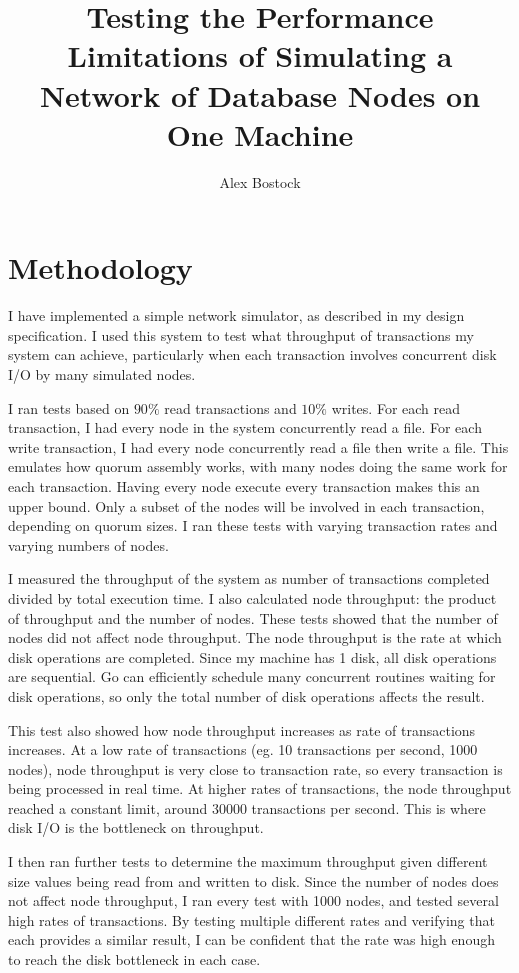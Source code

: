 \documentclass[12pt,a4paper]{article}
\title{Testing the Performance Limitations of Simulating a Network of Database Nodes on One Machine}
\author{Alex Bostock}
\date{}
\begin{document}
\maketitle
\thispagestyle{fancy}

\section*{Methodology}

I have implemented a simple network simulator, as described in my design specification. I used this system to test what throughput of transactions my system can achieve, particularly when each transaction involves concurrent disk I/O by many simulated nodes.

I ran tests based on $90\%$ read transactions and $10\%$ writes. For each read transaction, I had every node in the system concurrently read a file. For each write transaction, I had every node concurrently read a file then write a file. This emulates how quorum assembly works, with many nodes doing the same work for each transaction. Having every node execute every transaction makes this an upper bound. Only a subset of the nodes will be involved in each transaction, depending on quorum sizes. I ran these tests with varying transaction rates and varying numbers of nodes.

I measured the throughput of the system as number of transactions completed divided by total execution time. I also calculated node throughput: the product of throughput and the number of nodes. These tests showed that the number of nodes did not affect node throughput. The node throughput is the rate at which disk operations are completed. Since my machine has 1 disk, all disk operations are sequential. Go can efficiently schedule many concurrent routines waiting for disk operations, so only the total number of disk operations affects the result.

This test also showed how node throughput increases as rate of transactions increases. At a low rate of transactions (eg. 10 transactions per second, 1000 nodes), node throughput is very close to transaction rate, so every transaction is being processed in real time. At higher rates of transactions, the node throughput reached a constant limit, around 30000 transactions per second. This is where disk I/O is the bottleneck on throughput.

I then ran further tests to determine the maximum throughput given different size values being read from and written to disk. Since the number of nodes does not affect node throughput, I ran every test with 1000 nodes, and tested several high rates of transactions. By testing multiple different rates and verifying that each provides a similar result, I can be confident that the rate was high enough to reach the disk bottleneck in each case.
\end{document}
